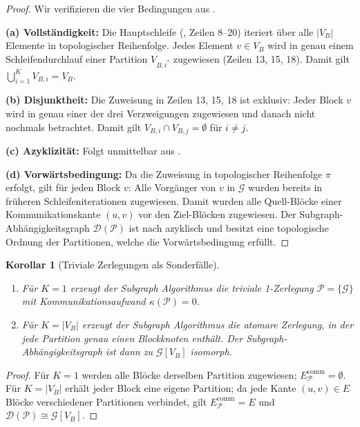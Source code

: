 ﻿\documentclass[12pt,a4paper]{article}
\newtheorem{korollar}[theorem]{Korollar}
\theoremstyle{definition}
\begin{document}
\begin{proof}
Wir verifizieren die vier Bedingungen aus .

\medskip
\textbf{(a) Vollständigkeit:} Die Hauptschleife (,
Zeilen 8--20) iteriert über alle $|V_B|$ Elemente in topologischer
Reihenfolge. Jedes Element $v \in V_B$ wird in genau einem Schleifendurchlauf
einer Partition $V_{B,i^*}$ zugewiesen (Zeilen 13, 15, 18). Damit gilt
$\bigcup_{i=1}^K V_{B,i} = V_B$.

\medskip
\textbf{(b) Disjunktheit:} Die Zuweisung in Zeilen 13, 15, 18 ist exklusiv:
Jeder Block $v$ wird in genau einer der drei Verzweigungen zugewiesen und
danach nicht nochmals betrachtet. Damit gilt $V_{B,i} \cap V_{B,j} = \emptyset$
für $i \neq j$.

\medskip
\textbf{(c) Azyklizität:} Folgt unmittelbar aus .

\medskip
\textbf{(d) Vorwärtsbedingung:} Da die Zuweisung in topologischer Reihenfolge
$\pi$ erfolgt, gilt für jeden Block $v$: Alle Vorgänger von $v$ in $\mathcal{G}$
wurden bereits in früheren Schleifeniterationen zugewiesen. Damit wurden alle
Quell-Blöcke einer Kommunikationskante $(u, v)$ vor den Ziel-Blöcken zugewiesen.
Der Subgraph-Abhängigkeitsgraph $\mathcal{D}(\mathcal{P})$ ist nach
 azyklisch und besitzt eine topologische Ordnung
der Partitionen, welche die Vorwärtsbedingung erfüllt.
\end{proof}

\begin{korollar}[Triviale Zerlegungen als Sonderfälle]
\label{kor:trivial}
\begin{enumerate}[label=(\roman*), nosep]
  \item Für $K = 1$ erzeugt der Subgraph Algorithmus die triviale
        1-Zerlegung $\mathcal{P} = \{\mathcal{G}\}$ mit Kommunikationsaufwand
        $\kappa(\mathcal{P}) = 0$.
  \item Für $K = |V_B|$ erzeugt der Subgraph Algorithmus die atomare
        Zerlegung, in der jede Partition genau einen Blockknoten enthält.
        Der Subgraph-Abhängigkeitsgraph ist dann zu $\mathcal{G}[V_B]$
        isomorph.
\end{enumerate}
\end{korollar}

\begin{proof}
Für $K = 1$ werden alle Blöcke derselben Partition zugewiesen;
$E_{\mathcal{P}}^{\mathrm{comm}} = \emptyset$. Für $K = |V_B|$ erhält
jeder Block eine eigene Partition; da jede Kante $(u,v)\in E$ Blöcke
verschiedener Partitionen verbindet, gilt
$E_{\mathcal{P}}^{\mathrm{comm}} = E$ und
$\mathcal{D}(\mathcal{P}) \cong \mathcal{G}[V_B]$.
\end{proof}
\end{document}
